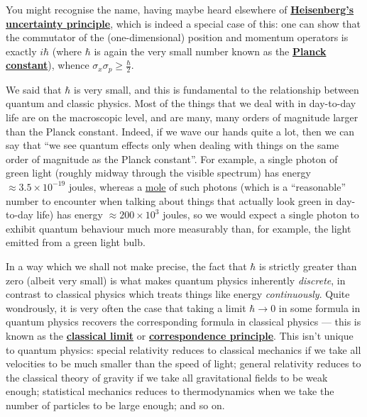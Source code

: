 \documentclass[fleqn]{article}
\newenvironment{technical}{\noindent}{\medskip}
\begin{document}
You might recognise the name, having maybe heard elsewhere of \href{https://en.wikipedia.org/wiki/Uncertainty_principle}{\textbf{Heisenberg's uncertainty principle}}, which is indeed a special case of this: one can show that the commutator of the (one-dimensional) position and momentum operators is exactly \(i\hbar\) (where \(\hbar\) is again the very small number known as the \href{https://en.wikipedia.org/wiki/Planck_constant}{\textbf{Planck constant}}), whence \(\sigma_x\sigma_p\geqslant\frac{\hbar}{2}\).

\begin{technical}
We said that \(\hbar\) is very small, and this is fundamental to the relationship between quantum and classic physics.
Most of the things that we deal with in day-to-day life are on the macroscopic level, and are many, many orders of magnitude larger than the Planck constant.
Indeed, if we wave our hands quite a lot, then we can say that ``we see quantum effects only when dealing with things on the same order of magnitude as the Planck constant''.
For example, a single photon of green light (roughly midway through the visible spectrum) has energy \(\approx3.5\times10^{-19}\) joules, whereas a \href{https://en.wikipedia.org/wiki/Mole_(unit)}{mole} of such photons (which is a ``reasonable'' number to encounter when talking about things that actually look green in day-to-day life) has energy \(\approx200\times10^{3}\) joules, so we would expect a single photon to exhibit quantum behaviour much more measurably than, for example, the light emitted from a green light bulb.

In a way which we shall not make precise, the fact that \(\hbar\) is strictly greater than zero (albeit very small) is what makes quantum physics inherently \emph{discrete}, in contrast to classical physics which treats things like energy \emph{continuously}.
Quite wondrously, it is very often the case that taking a limit \(\hbar\to0\) in some formula in quantum physics recovers the corresponding formula in classical physics --- this is known as the \href{https://en.wikipedia.org/wiki/Classical_limit}{\textbf{classical limit}} or \href{https://en.wikipedia.org/wiki/Correspondence_principle}{\textbf{correspondence principle}}.
This isn't unique to quantum physics: special relativity reduces to classical mechanics if we take all velocities to be much smaller than the speed of light; general relativity reduces to the classical theory of gravity if we take all gravitational fields to be weak enough; statistical mechanics reduces to thermodynamics when we take the number of particles to be large enough; and so on.


\end{technical}
\end{document}
